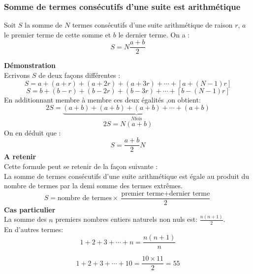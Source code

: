  \subsubsection*{Somme de termes consécutifs d'une suite est arithmétique}
   \begin{theorem} Soit $S$ la somme  de $ N $ termes consécutifs d'une  suite  arithmétique  de raison $ r $,  $ a $ le premier terme de cette somme  et $ b $ le dernier terme. On a  :     \[  S =N\dfrac{a+b}{2}\]
   \end{theorem}
 \textbf{\color{blue}Démonstration}  \\
  Ecrivons $ S $ de deux façons différentes :
  \[S= a+(a+r)+(a+2r)+ (a+3r)+ \cdots +[a+(N-1)r] \]
   \[S= b+(b-r)+(b-2r)+ (b-3r)+ \cdots +[b-(N-1)r] \]
   En additionnant membre à membre ces deux égalités ,on obtient: 
   \[2S=\underbrace{(a+b)+(a+b)+(a+b)+ \cdots +(a+b)}_{ N \text{fois}} \]
   \[2S=N(a+b)\]On en déduit que :\[S =\dfrac{a+b}{2} N\]
   \textbf{A retenir}\\ 
   Cette formule peut se retenir de la façon suivante :\\La somme de termes consécutifs d'une suite arithmétique est égale au produit du nombre de termes  par la demi somme des termes extrêmes.
   \[ S=\text{nombre  de termes}\times\dfrac{\text{premier terme}+\text{dernier terme} }{2} \]
   \textbf{Cas particulier}	\\
   La somme des $ n$ premiers nombres entiers naturels non nuls est:  $ \frac{n(n+1)}{2} $. \\En d'autres termes:
   \[1+2+3 + \cdots + n=\dfrac{n(n+1)}{n} \]
 \begin{example}
   \[1+2+3+\cdots + 10=\dfrac{10\times 11}{2}=55\]
   \end{example}
  
